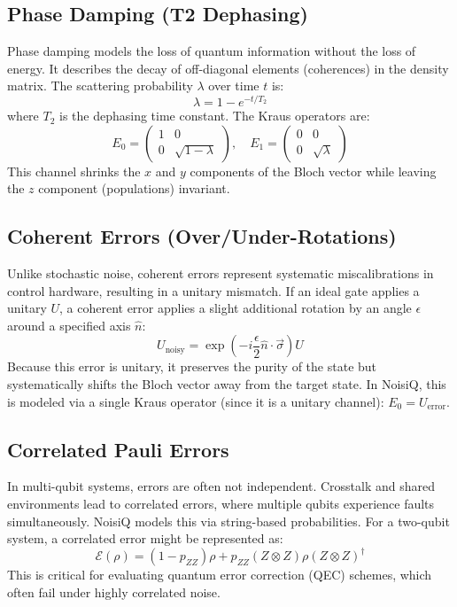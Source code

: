 \documentclass[11pt, a4paper]{article}
\begin{document}
\subsection{Phase Damping (T2 Dephasing)}
Phase damping models the loss of quantum information without the loss of energy. It describes the decay of off-diagonal elements (coherences) in the density matrix. The scattering probability $\lambda$ over time $t$ is:
\begin{equation}
    \lambda = 1 - e^{-t / T_2}
\end{equation}
where $T_2$ is the dephasing time constant. The Kraus operators are:
\begin{equation}
    E_0 = \begin{pmatrix} 1 & 0 \\ 0 & \sqrt{1-\lambda} \end{pmatrix}, \quad 
    E_1 = \begin{pmatrix} 0 & 0 \\ 0 & \sqrt{\lambda} \end{pmatrix}
\end{equation}
This channel shrinks the $x$ and $y$ components of the Bloch vector while leaving the $z$ component (populations) invariant.

\subsection{Coherent Errors (Over/Under-Rotations)}
Unlike stochastic noise, coherent errors represent systematic miscalibrations in control hardware, resulting in a unitary mismatch. If an ideal gate applies a unitary $U$, a coherent error applies a slight additional rotation by an angle $\epsilon$ around a specified axis $\hat{n}$:
\begin{equation}
    U_{\text{noisy}} = \exp\left(-i \frac{\epsilon}{2} \hat{n} \cdot \vec{\sigma}\right) U
\end{equation}
Because this error is unitary, it preserves the purity of the state but systematically shifts the Bloch vector away from the target state. In NoisiQ, this is modeled via a single Kraus operator (since it is a unitary channel): $E_0 = U_{\text{error}}$.

\subsection{Correlated Pauli Errors}
In multi-qubit systems, errors are often not independent. Crosstalk and shared environments lead to correlated errors, where multiple qubits experience faults simultaneously. NoisiQ models this via string-based probabilities. For a two-qubit system, a correlated error might be represented as:
\begin{equation}
    \mathcal{E}(\rho) = (1 - p_{ZZ}) \rho + p_{ZZ} (Z \otimes Z) \rho (Z \otimes Z)^\dagger
\end{equation}
This is critical for evaluating quantum error correction (QEC) schemes, which often fail under highly correlated noise.
\end{document}
